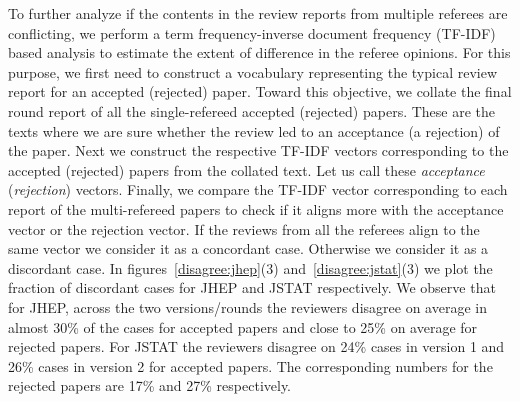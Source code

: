 To further analyze if the contents in the review reports 
from multiple referees are conflicting, we perform a term frequency-inverse document frequency (TF-IDF) based analysis to estimate the extent of difference in the referee 
opinions. For this purpose, we first need to construct a vocabulary representing the typical review report for an accepted (rejected) paper. Toward this objective, we collate the 
final round report of all the single-refereed accepted (rejected) papers. These are the texts where 
we are sure whether the review led to an acceptance (a rejection) of the paper. Next we construct the respective TF-IDF vectors corresponding to the accepted (rejected) 
papers from the collated text. Let us call these {\em acceptance} ({\em rejection}) vectors. Finally, we compare the TF-IDF vector corresponding to each report of the 
multi-refereed papers to check if it aligns more with
the acceptance vector or the rejection vector. If the reviews from all the referees align to the same vector we consider it as a concordant case. Otherwise we consider 
it as a discordant case. 
In figures~\ref{disagree:jhep}(3) and~\ref{disagree:jstat}(3) we plot the fraction of discordant cases for JHEP and JSTAT respectively. We observe that for JHEP, 
across the two versions/rounds the reviewers disagree on average in almost 30\% of the cases for accepted papers and close to 25\% on average for rejected papers. 
For JSTAT the reviewers disagree on 24\% cases in version 1 and 26\% cases in version 2 for accepted papers. The corresponding numbers for 
the rejected papers are 17\% and 27\% respectively.

% 



